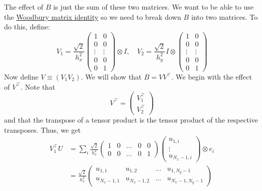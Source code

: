 \documentclass[reqno]{article}
\begin{document}
	The effect of $B$ is just the sum of these two matrices. We want to be able to use the \href{https://en.wikipedia.org/wiki/Woodbury_matrix_identity}{Woodbury matrix identity} so we need to break down $B$ into two matrices. To do this, define:
	\begin{equation}
		V_1 = \frac{\sqrt{2}}{h_x^2} \begin{pmatrix}
		1&0\\
		0&0\\
		\vdots&\vdots\\
		0&0\\
		0&1
		\end{pmatrix} \otimes I, \quad
		V_2 = \frac{\sqrt{2}}{h_y^2} I \otimes \begin{pmatrix}
		1&0\\
		0&0\\
		\vdots&\vdots\\
		0&0\\
		0&1
		\end{pmatrix}
	\end{equation}
	Now define $V \equiv \left( V_1 V_2 \right)$. We will show that $B = V V^\top$. We begin with the effect of $V^\top$. Note that
	\begin{equation}
		V^\top =
		\begin{pmatrix}
			V_1^\top \\
			V_2^\top
		\end{pmatrix}
	\end{equation}
	and that the transpose of a tensor product is the tensor product of the respective transposes. Thus, we get
	\begin{equation}
	\begin{split}
		V_1^\top U &= 
		\sum_i
		\frac{\sqrt{2}}{h_x^2} 
		\begin{pmatrix}
			1 &0 &\ldots &0 &0 \\
			0 &0 &\ldots &0 &1
		\end{pmatrix}
		\begin{pmatrix}
			u_{1, i} \\
			\vdots \\
			u_{N_x - 1, i}
		\end{pmatrix}
		\otimes e_i \\
		&= \frac{\sqrt{2}}{h_x^2}
		\begin{pmatrix}
			u_{1, 1} &u_{1, 2} &\ldots &u_{1, N_y - 1} \\
			u_{N_x - 1, 1} &u_{N_x - 1, 2} &\ldots &u_{N_x - 1, N_y - 1}
		\end{pmatrix}
	\end{split}
	\end{equation}
\end{document}
